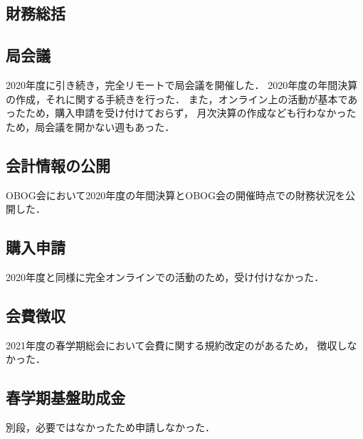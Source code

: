\subsection*{財務総括}


\subsection*{局会議}
2020年度に引き続き，完全リモートで局会議を開催した．
2020年度の年間決算の作成，それに関する手続きを行った．
また，オンライン上の活動が基本であったため，購入申請を受け付けておらず，
月次決算の作成なども行わなかったため，局会議を開かない週もあった．

\subsection*{会計情報の公開}
OBOG会において2020年度の年間決算とOBOG会の開催時点での財務状況を公開した．

\subsection*{購入申請}
2020年度と同様に完全オンラインでの活動のため，受け付けなかった．

\subsection*{会費徴収}
2021年度の春学期総会において会費に関する規約改定のがあるため，
徴収しなかった．

\subsection*{春学期基盤助成金}
別段，必要ではなかったため申請しなかった．
